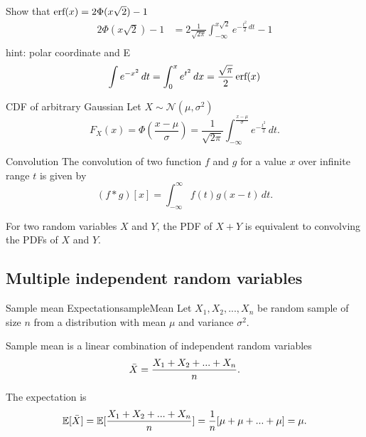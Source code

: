 \begin{exec}
  Show that $\operatorname{\text{erf}}(x)=2\Phi(x\sqrt{2})-1$
  \tcblower
  \TODO
  \begin{align*}
    2\Phi(x\sqrt{2})-1
    &= 2\frac{1}{\sqrt{2\pi}}\int_{-\infty}^{x\sqrt{2}}e^{-\frac{t^2}{2}\,dt}-1\\
  \end{align*}
  \TODO hint: polar coordinate and E
  \begin{equation*}
    \int e^{-x^2}\,dt = \int_{0}^{x} e^{t^2}\,dx = \frac{\sqrt{\pi}}{2}\operatorname{\text{erf}}(x)
  \end{equation*}
\end{exec}

\begin{fact}{CDF of arbitrary Gaussian}{}
  Let $X\sim \mathcal{N}(\mu, \sigma^2)$
  \begin{equation*}
    F_X(x)=\Phi(\frac{x-\mu}{\sigma}) = \frac{1}{\sqrt{2\pi}}\int_{-\infty}^{\frac{x-\mu}{\sigma}} e^{-\frac{t^2}{2}}\,dt.
  \end{equation*}
\end{fact}

\begin{fact}{Convolution}{}
  The convolution of two function $f$ and $g$ for a value $x$ over infinite range $t$ is given by
  \begin{equation*}
    (f*g)[x] = \int_{-\infty}^{\infty}f(t)g(x-t)\,dt.
  \end{equation*}
\end{fact}

For two random variables $X$ and $Y$, the PDF of $X+Y$ is equivalent to convolving the PDFs of $X$ and $Y$.

\subsection{Multiple independent random variables}

\begin{fact}{Sample mean \g  Expectation}{sampleMean}
  Let $X_1,X_2,...,X_n$ be random sample of size $n$ from a distribution with mean $\mu$ and variance $\sigma^2$.

  Sample mean is a linear combination of independent random variables
  \begin{equation*}
    \bar{X}=\frac{X_1+X_2+...+X_n}{n}.
  \end{equation*}

  The expectation is
  \begin{equation*}
    \mathbb{E}[\bar{X}]=\mathbb{E}[\frac{X_1+X_2+...+X_n}{n}]=\frac{1}{n}[\mu+\mu+...+\mu]=\mu.
  \end{equation*}
\end{fact}

